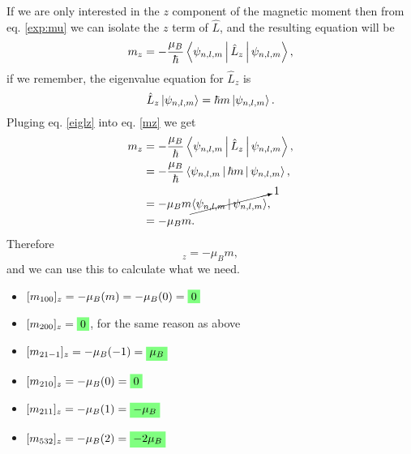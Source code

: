 \begin{questions}
\begin{solution}
\end{solution}

\begin{solution}
  If we are only interested in the $z$ component of the magnetic moment then from eq. \ref{exp:mu} we can isolate the $z$ term of $\hat{L}$, and the resulting equation will be
  \begin{equation}
    m_z = -\frac{\mu_B}{\hbar}\Braket{ \psi_{n,l,m}| \hat{L}_z |\psi_{n,l,m} },
    \label{mz}
  \end{equation}
  if we remember, the eigenvalue equation for $\hat{L}_z$ is
  \begin{equation}
    \hat{L}_z \ket{\psi_{n,l,m}} = \hbar m \ket{\psi_{n,l,m}}.
    \label{eiglz}
  \end{equation}
  Pluging eq. \ref{eiglz} into eq. \ref{mz}  we get
  \begin{eqnarray}
    \begin{aligned}
      m_z &= -\frac{\mu_B}{\hbar}\Braket{ \psi_{n,l,m}| \hat{L}_z |\psi_{n,l,m} },\nonumber\\
      & = -\frac{\mu_B}{\hbar}\Braket{ \psi_{n,l,m}| \hbar m|\psi_{n,l,m} }, \nonumber \\
      & = -\mu_B m \cancelto{1}{\Braket{ \psi_{n,l,m}|\psi_{n,l,m} }}, \nonumber\\
      & = -\mu_B m.
    \end{aligned}
  \end{eqnarray}
  Therefore
  \begin{equation}
    [m_{n,l,m}]_z = -\mu_B m,
  \end{equation}
  and we can use this to calculate what we need.

  \begin{itemize}
    \item $[m_{100}]_z = - \mu_B(m)= - \mu_B(0) = \hlgreen{0}$
    \item $[m_{200}]_z = \hlgreen{0}$, for the same reason as above
    \item $[m_{21-1}]_z =- \mu_B(-1) = \hlgreen{\mu_B}$
    \item $[m_{210}]_z= - \mu_B(0) = \hlgreen{0 }$
    \item $[m_{211}]_z =- \mu_B(1) = \hlgreen{-\mu_B}$
    \item $[m_{532}]_z =- \mu_B(2) = \hlgreen{-2\mu_B}$
  \end{itemize}
\end{solution}

\end{questions}
